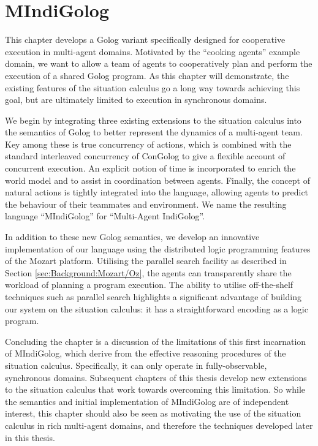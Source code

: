 

\chapter{MIndiGolog}

\label{ch:mindigolog}

This chapter develops a Golog variant specifically designed for cooperative
execution in multi-agent domains. Motivated by the {}``cooking agents''
example domain, we want to allow a team of agents to cooperatively
plan and perform the execution of a shared Golog program. As this
chapter will demonstrate, the existing features of the situation calculus
go a long way towards achieving this goal, but are ultimately limited
to execution in synchronous domains.

We begin by integrating three existing extensions to the situation
calculus into the semantics of Golog to better represent the dynamics
of a multi-agent team. Key among these is true concurrency of actions,
which is combined with the standard interleaved concurrency of ConGolog
to give a flexible account of concurrent execution. An explicit notion
of time is incorporated to enrich the world model and to assist in
coordination between agents. Finally, the concept of natural actions
is tightly integrated into the language, allowing agents to predict
the behaviour of their teammates and environment. We name the resulting
language {}``MIndiGolog'' for {}``Multi-Agent IndiGolog''.

In addition to these new Golog semantics, we develop an innovative
implementation of our language using the distributed logic programming
features of the Mozart platform. Utilising the parallel search facility
as described in Section \ref{sec:Background:Mozart/Oz}, the agents
can transparently share the workload of planning a program execution.
The ability to utilise off-the-shelf techniques such as parallel search
highlights a significant advantage of building our system on the situation
calculus: it has a straightforward encoding as a logic program.

Concluding the chapter is a discussion of the limitations of this
first incarnation of MIndiGolog, which derive from the effective reasoning
procedures of the situation calculus. Specifically, it can only operate
in fully-observable, synchronous domains. Subsequent chapters of this
thesis develop new extensions to the situation calculus that work
towards overcoming this limitation. So while the semantics and initial
implementation of MIndiGolog are of independent interest, this chapter
should also be seen as motivating the use of the situation calculus
in rich multi-agent domains, and therefore the techniques developed
later in this thesis.

